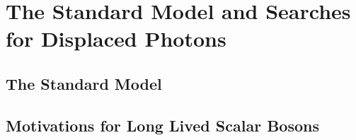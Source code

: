 
\chapter{The Standard Model and Searches for Displaced Photons}
\label{chap:theory}

\section{The Standard Model}

\section{Motivations for Long Lived Scalar Bosons}